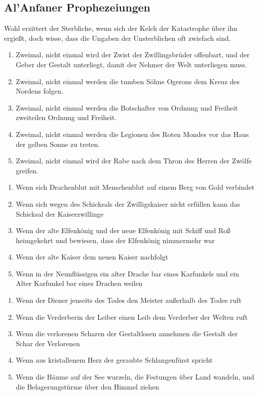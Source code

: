 \subsection{Al'Anfaner Prophezeiungen}

Wohl erzittert der Sterbliche, wenn sich der Kelch der Katastrophe über ihn ergießt, doch wisse, dass die Ungaben der Unsterblichen oft zwiefach sind. 
\begin{enumerate}
\item Zweimal, nicht einmal wird der Zwist der Zwillingsbrüder 
offenbart, und der Geber der Gestalt unterliegt, damit der Nehmer der Welt unterliegen muss. 
\item Zweimal, nicht einmal werden die tumben Söhne Ogerons dem Kreuz des Nordens folgen. 
\item Zweimal, nicht einmal werden die Botschafter von Ordnung und Freiheit zweiteilen Ordnung und Freiheit. 
\item Zweimal, nicht einmal werden die Legionen des Roten Mondes vor das Haus der gelben Sonne zu treten. 
\item Zweimal, nicht einmal wird der Rabe nach dem Thron des Herren der Zwölfe greifen. 
\end{enumerate}
\vspace{5mm}
\begin{enumerate}
\item Wenn sich Drachenblut mit Menschenblut auf einem Berg von Gold verbindet
\item Wenn sich wegen des Schicksals der Zwilligskaiser nicht erfüllen kann das Schicksal der Kaiserzwillinge
\item Wenn der alte Elfenkönig und der neue Elfenkönig mit Schiff und Roß heimgekehrt und bewiesen, dass der Elfenkönig nimmermehr war
\item Wenn der alte Kaiser dem neuen Kaiser nachfolgt
\item Wenn in der Neunflüssigen ein alter Drache bar eines Karfunkels und ein Alter Karfunkel bar eines Drachen weilen
\end{enumerate}
\vspace{5mm}
\begin{enumerate}
\item Wenn der Diener jenseits des Todes den Meister außerhalb des Todes ruft
\item Wenn die Verderberin der Leiber einen Leib dem Verderber der Welten ruft
\item Wenn die verlorenen Scharen der Gestaltlosen annehmen die Gestalt der Schar der Verlorenen 
\item Wenn aus kristallenem Herz der geraubte Schlangenfürst spricht
\item Wenn die Bäume auf der See wurzeln, die Festungen über Land wandeln, und die Belagerungstürme über den Himmel ziehen
\end{enumerate}
